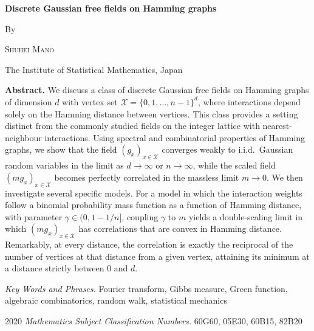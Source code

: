 \documentclass[a4paper,11pt]{article}
\theoremstyle{plain}
\theoremstyle{definition}
\begin{document}
\begin{center}

  {\Large\bf
    Discrete Gaussian free fields on Hamming graphs}
  
  \normalsize

  \bigskip By \bigskip

  \textsc{Shuhei Mano}

  \smallskip
  
  The Institute of Statistical Mathematics, Japan
  

\end{center}

\small

{\bf Abstract.}
  We discuss a class of discrete Gaussian free fields
  on Hamming graphs
  of dimension $d$ with vertex set
  $\mathcal{X}=\{0,1,\ldots,n-1\}^d$,
  where interactions depend solely on the Hamming
  distance between vertices. This class provides
  a setting distinct from the commonly studied
  fields on the integer lattice with nearest-neighbour
  interactions.
  Using spectral and combinatorial properties of
  Hamming graphs,
  we show that the field $(g_x)_{x\in\mathcal{X}}$
  converges weakly to i.i.d.\ Gaussian random
  variables in the limit as $d\to\infty$ or
  $n\to\infty$, while the scaled field
  $(mg_x)_{x\in\mathcal{X}}$ becomes perfectly
  correlated in the massless limit $m\to 0$.
  We then investigate several specific models.
  For a model in which the interaction weights
  follow a binomial probability mass function
  as a function of Hamming distance, with parameter
  $\gamma\in(0,1-1/n]$, coupling $\gamma$ to $m$
  yields a double-scaling limit in which
  $(mg_x)_{x\in\mathcal{X}}$ has correlations
  that are convex in Hamming distance.
  Remarkably, at every distance, the correlation is
  exactly the reciprocal of the number of vertices
  at that distance from a given vertex, attaining
  its minimum at a distance strictly between $0$ and $d$.
  
\smallskip

{\it Key Words and Phrases.}
Fourier transform, Gibbs measure, Green function,
algebraic combinatorics, random walk, statistical mechanics

\smallskip

2020 {\it Mathematics Subject Classification Numbers.}
60G60, 05E30, 60B15, 82B20

\normalsize
\end{document}
